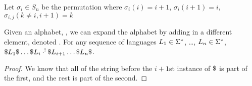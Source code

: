 \begin{definition}
Let $\sigma_{i} \in S_n$ be the permutation where
$\sigma_{i}(i) = i+1$, $\sigma_{i}(i+1) = i$, $\sigma_{i,j}(k\neq i,i+1) = k$
\end{definition}

\begin{theorem}
Given an alphabet, \Alphabet{}, we can expand the alphabet by adding in a different
element, denoted \Sep{}.
For any sequence of languages $L_1\in\Sigma^*$, \ldots,
$L_n\in\Sigma^*$,  $\Sep\Language_1\Sep\ldots\Sep\Language_i
\UnambigConcat
\Sep\Language_{i+1}\ldots\Sep\Language_n\Sep$.
\end{theorem}
\begin{proof}
We know that all of the string before the $i+1$st instance of $\Sep$ is
part of the first, and the rest is part of the second.
\end{proof}

